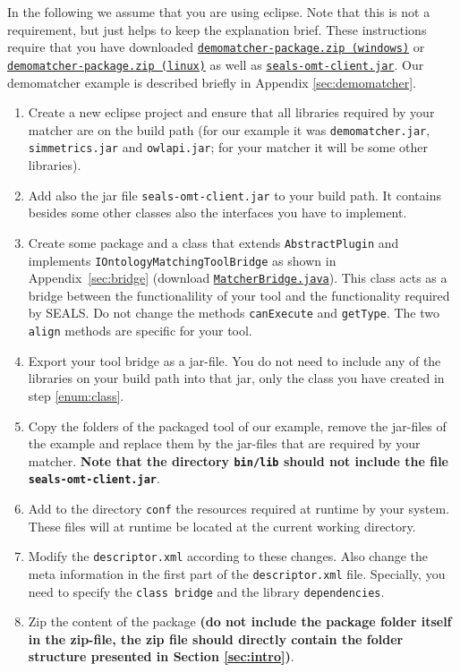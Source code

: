 \documentclass{article}
\def\file#1{\textcolor{grayy}{\texttt{#1}}}
\begin{document}
In the following we assume that you are using eclipse. Note that this is not a requirement, but just helps to keep the explanation brief. These instructions require that you have downloaded \href{http://oaei.ontologymatching.org/2011/tutorial/windows/demomatcher-package.zip}{\nolinkurl{demomatcher-package.zip (windows)}} or \href{http://oaei.ontologymatching.org/2011/tutorial/linux/demomatcher-package.zip}{\nolinkurl{demomatcher-package.zip (linux)}} as well as \href{http://oaei.ontologymatching.org/2011.5/tutorial/seals-omt-client.jar}{\nolinkurl{seals-omt-client.jar}}. Our demomatcher example is described briefly in Appendix \ref{sec:demomatcher}.
\begin{enumerate}
	\item Create a new eclipse project and ensure that all libraries required by your matcher are on the build path (for our example it was \file{demomatcher.jar}, \file{simmetrics.jar} and \file{owlapi.jar}; for your matcher it will be some other libraries).
	\item Add also the jar file \file{seals-omt-client.jar} to your build path. It contains besides some other classes also the interfaces you have to implement.

	\item Create some package and a class that extends \verb|AbstractPlugin| and implements \verb|IOntologyMatchingToolBridge| as shown in Appendix~\ref{sec:bridge} (download \href{http://oaei.ontologymatching.org/2011/tutorial/MatcherBridge.java}{\nolinkurl{MatcherBridge.java}}). This class acts as a bridge between the functionalility of your tool and the functionality required by SEALS. Do not change the methods  \verb|canExecute| and \verb|getType|. The two \verb|align| methods are specific for your tool. \label{enum:class}
	\item Export your tool bridge as a jar-file. You do not need to include any of the libraries on your build path into that jar, only the class you have created in step \ref{enum:class}.
	\item Copy the folders of the packaged tool of our example, remove the jar-files of the example and replace them by the jar-files that are required by your matcher. 
	\textbf{Note that the directory \file{bin/lib} should not include the file \file{seals-omt-client.jar}}.
	\item Add to the directory \file{conf} the resources required at runtime by your system. These files will at runtime be located at the current working directory.
	\item Modify the \file{descriptor.xml} according to these changes. Also change the meta information in the first part of the \file{descriptor.xml} file. Specially, you need to specify the \verb|class bridge| and the library \verb|dependencies|. 
	\item Zip the content of the package \textbf{(do not include the package folder itself in the zip-file, the zip file should directly contain the folder structure presented in Section \ref{sec:intro})}.
\end{enumerate}
\end{document}
